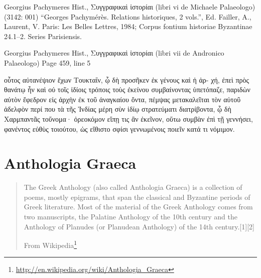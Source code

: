 \documentclass[12pt,letterpaper,twoside,final]{memoir}
\begin{document}
\begin{greek}

Georgius Pachymeres Hist., Συγγραφικαὶ ἱστορίαι (libri vi de Michaele Palaeologo) (3142: 001)
“Georges Pachymérès. Relations historiques, 2 vols.”, Ed. Failler, A., Laurent, V.
Paris: Les Belles Lettres, 1984; Corpus fontium historiae Byzantinae 24.1–2. Series Parisiensis.

Georgius Pachymeres Hist., Συγγραφικαὶ ἱστορίαι (libri vii de Andronico Palaeologo) 
Page 459, line 5

                                                             οὗτος   
αὐτανέψιον ἔχων Τουκταΐν, ᾧ δὴ προσῆκεν ἐκ γένους καὶ ἡ ἀρ-
χή, ἐπεὶ πρὸς θανάτῳ ἦν καὶ οὐ τοῖς ἰδίοις τρόποις τοὺς ἐκείνου 
συμβαίνοντας ὑπετόπαζε, παριδὼν αὐτὸν ἔφεδρον εἰς ἀρχὴν ἐκ 
τοῦ ἀναγκαίου ὄντα, πέμψας μετακαλεῖται τὸν αὐτοῦ ἀδελφὸν 
περί που τὰ τῆς Ἰνδίας μέρη σὺν ἰδίῳ στρατεύματι διατρίβοντα, 
ᾧ δὴ Χαρμπαντᾶς τοὔνομα· ὀρεοκόμον εἴπῃ τις ἂν ἐκεῖνον, 
οὕτω συμβὰν ἐπὶ τῇ γεννήσει, φανέντος εὐθὺς τοιούτου, ὡς 
εἴθιστο σφίσι γεννωμένοις ποιεῖν κατά τι νόμιμον. 

\end{greek}



\section{Anthologia Graeca}
\blockquote[From Wikipedia\footnote{\url{http://en.wikipedia.org/wiki/Anthologia_Graeca}}]{The Greek Anthology (also called Anthologia Graeca) is a collection of poems, mostly epigrams, that span the classical and Byzantine periods of Greek literature. Most of the material of the Greek Anthology comes from two manuscripts, the Palatine Anthology of the 10th century and the Anthology of Planudes (or Planudean Anthology) of the 14th century.[1][2]}
\end{document}
